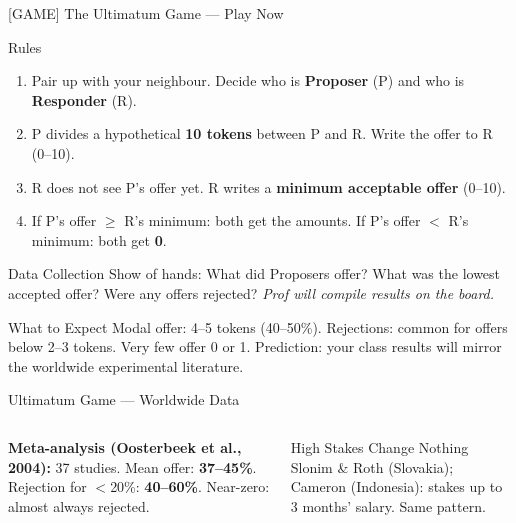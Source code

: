 \documentclass[aspectratio=169]{beamer}
\begin{document}
\begin{frame}{[GAME] The Ultimatum Game --- Play Now}
\begin{block}{Rules}
\begin{enumerate}
  \item Pair up with your neighbour. Decide who is \textbf{Proposer} (P) and who is \textbf{Responder} (R).
  \item P divides a hypothetical \textbf{10 tokens} between P and R. Write the offer to R (0--10).
  \item R does not see P's offer yet. R writes a \textbf{minimum acceptable offer} (0--10).
  \item If P's offer $\geq$ R's minimum: both get the amounts. If P's offer $<$ R's minimum: both get \textbf{0}.
\end{enumerate}
\end{block}
\begin{block}{Data Collection}
Show of hands: What did Proposers offer? What was the lowest accepted offer? Were any offers rejected? \textit{Prof will compile results on the board.}
\end{block}
\begin{exampleblock}{What to Expect}
Modal offer: 4--5 tokens (40--50\%). Rejections: common for offers below 2--3 tokens. Very few offer 0 or 1. Prediction: your class results will mirror the worldwide experimental literature.
\end{exampleblock}
\end{frame}

\begin{frame}{Ultimatum Game --- Worldwide Data}
\begin{columns}
\textcolor{beblue}{\textbf{Meta-analysis (Oosterbeek et al., 2004):}} 37 studies. Mean offer: \textbf{37--45\%}. Rejection for $<$20\%: \textbf{40--60\%}. Near-zero: almost always rejected.

\begin{alertblock}{High Stakes Change Nothing}
Slonim \& Roth (Slovakia); Cameron (Indonesia): stakes up to 3 months' salary. Same pattern.
\end{alertblock}
\end{columns}
\end{frame}
\end{document}
